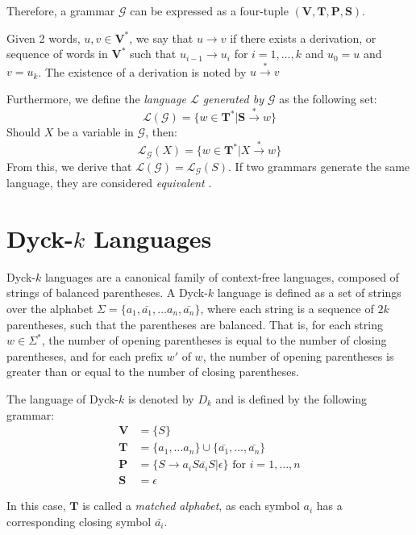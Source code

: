 Therefore, a grammar $\mathcal{G}$ can be expressed as a four-tuple $(\mathbf{V}, \mathbf{T}, \mathbf{P}, \mathbf{S})$. 

Given 2 words, $u, v \in \mathbf{V}^*$, we say that $u \rightarrow v$ if there exists a derivation, or sequence of words in $\mathbf{V}^*$ such that $u_{i-1} \rightarrow u_{i}$ for $i = 1,\dots,k$ and $u_0=u$ and $v=u_k$. The existence of a derivation is noted by $u \xrightarrow{*} v$

Furthermore, we define the \emph{language $\mathcal{L}$ generated by $\mathcal{G}$} as the following set:
$$
\mathcal{L}(\mathcal{G}) = \{w \in \mathbf{T}^* | \mathbf{S} \xrightarrow{*} w \}
$$
Should $X$ be a variable in $\mathcal{G}$, then:
$$
\mathcal{L}_{\mathcal{G}}(X) = \{ w \in \mathbf{T}^* | X \xrightarrow{*} w\}
$$
From this, we derive that $\mathcal{L}(\mathcal{G}) = \mathcal{L}_{\mathcal{G}}(S)$. If two grammars generate the same language, they are considered \emph{equivalent} \cite{leeuwen-cfg}.

\section{Dyck-$k$ Languages}
Dyck-$k$ languages are a canonical family of context-free languages, composed of strings of balanced parentheses.
A Dyck-$k$ language is defined as a set of strings over the alphabet $\Sigma = \{ a_1, \bar{a_1}, \dots a_n, \bar{a_n}\}$, where each string is a sequence of $2k$ parentheses, such that the parentheses are balanced. 
That is, for each string $w \in \Sigma^*$, the number of opening parentheses is equal to the number of closing parentheses, and for each prefix $w'$ of $w$, the number of opening parentheses is greater than or equal to the number of closing parentheses.

The language of Dyck-$k$ is denoted by $D_k$ and is defined by the following grammar:
\begin{align*}
    \mathbf{V} &= \{S\} \\
    \mathbf{T} &= \{a_1, \dots a_n\} \cup \{ \bar{a_1}, \dots, \bar{a_n} \}\\
    \mathbf{P} &= \{ S \rightarrow a_i S \bar{a_i} S | \epsilon \} \text{ for } i = 1, \dots, n \\
    \mathbf{S} &= \epsilon
\end{align*}

In this case, $\mathbf{T}$ is called a \emph{matched alphabet}, as each symbol $a_i$ has a corresponding closing symbol $\bar{a_i}$.

